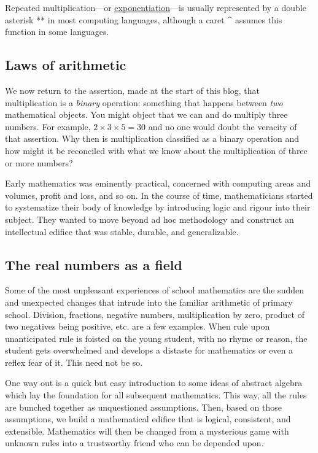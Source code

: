 \documentclass[
  a4paper,
]{article}
\begin{document}
Repeated multiplication---or
\protect\hyperlink{exponentiation}{exponentiation}---is usually
represented by a double asterisk ** in most computing languages,
although a caret \^{} assumes this function in some languages.

\hypertarget{laws-of-arithmetic}{%
\subsection{Laws of arithmetic}\label{laws-of-arithmetic}}

We now return to the assertion, made at the start of this blog, that
multiplication is a \emph{binary} operation: something that happens
between \emph{two} mathematical objects. You might object that we can
and do multiply three numbers. For example, \(2 \times 3 \times 5 = 30\)
and no one would doubt the veracity of that assertion. Why then is
multiplication classified as a binary operation and how might it be
reconciled with what we know about the multiplication of three or more
numbers?

Early mathematics was eminently practical, concerned with computing
areas and volumes, profit and loss, and so on. In the course of time,
mathematicians started to systematize their body of knowledge by
introducing logic and rigour into their subject. They wanted to move
beyond ad hoc methodology and construct an intellectual edifice that was
stable, durable, and generalizable.

\hypertarget{the-real-numbers-as-a-field}{%
\subsection{The real numbers as a
field}\label{the-real-numbers-as-a-field}}

Some of the most unpleasant experiences of school mathematics are the
sudden and unexpected changes that intrude into the familiar arithmetic
of primary school. Division, fractions, negative numbers, multiplication
by zero, product of two negatives being positive, etc. are a few
examples. When rule upon unanticipated rule is foisted on the young
student, with no rhyme or reason, the student gets overwhelmed and
develops a distaste for mathematics or even a reflex fear of it. This
need not be so.

One way out is a quick but easy introduction to some ideas of abstract
algebra which lay the foundation for all subsequent mathematics. This
way, all the rules are bunched together as unquestioned assumptions.
Then, based on those assumptions, we build a mathematical edifice that
is logical, consistent, and extensible. Mathematics will then be changed
from a mysterious game with unknown rules into a trustworthy friend who
can be depended upon.
\end{document}
